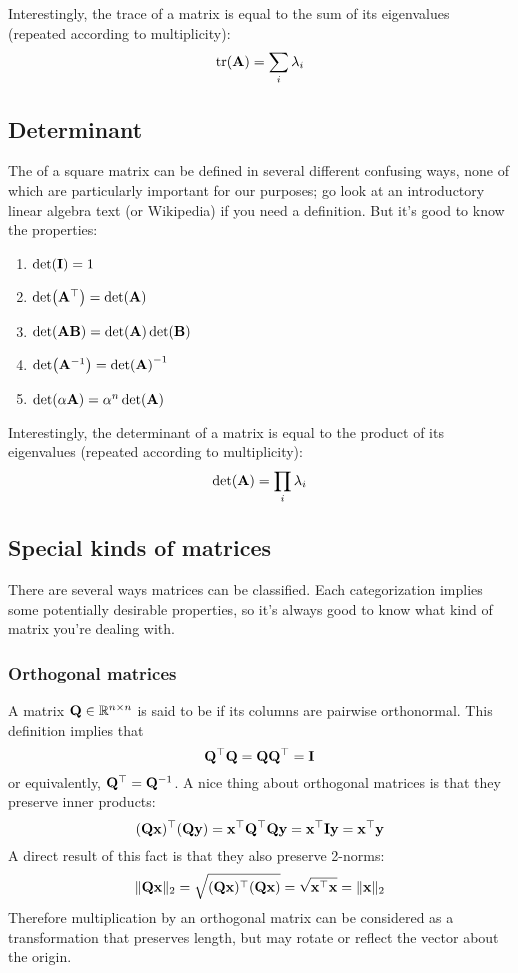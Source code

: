 Interestingly, the trace of a matrix is equal to the sum of its eigenvalues (repeated according to multiplicity):
\[\tr(\mathbf{A}) = \sum_i \lambda_i\]

\subsection{Determinant}
The  of a square matrix can be defined in several different confusing ways, none of which are particularly important for our purposes; go look at an introductory linear algebra text (or Wikipedia) if you need a definition.
But it's good to know the properties:
\begin{enumerate}
\item $\det(\mathbf{I}) = 1$
\item $\det(\mathbf{A}^\top) = \det(\mathbf{A})$
\item $\det(\mathbf{A}\mathbf{B}) = \det(\mathbf{A})\det(\mathbf{B})$
\item $\det(\mathbf{A}^{-1}) = \det(\mathbf{A})^{-1}$
\item $\det(\alpha\mathbf{A}) = \alpha^n \det(\mathbf{A})$
\end{enumerate}
Interestingly, the determinant of a matrix is equal to the product of its eigenvalues (repeated according to multiplicity):
\[\det(\mathbf{A}) = \prod_i \lambda_i\]

\subsection{Special kinds of matrices}
There are several ways matrices can be classified.
Each categorization implies some potentially desirable properties, so it's always good to know what kind of matrix you're dealing with.

\subsubsection{Orthogonal matrices}
A matrix $\mathbf{Q} \in \mathbb{R}^{n \times n}$ is said to be  if its columns are pairwise orthonormal.
This definition implies that
\[\mathbf{Q}^\top \mathbf{Q} = \mathbf{Q}\mathbf{Q}^\top = \mathbf{I}\]
or equivalently, $\mathbf{Q}^\top = \mathbf{Q}^{-1}$. A nice thing about orthogonal matrices is that they preserve inner products:
\[(\mathbf{Q}\mathbf{x})^\top(\mathbf{Q}\mathbf{y}) = \mathbf{x}^\top \mathbf{Q}^\top \mathbf{Q}\mathbf{y} = \mathbf{x}^\top \mathbf{I}\mathbf{y} = \mathbf{x}^\top\mathbf{y}\]
A direct result of this fact is that they also preserve 2-norms:
\[\|\mathbf{Q}\mathbf{x}\|_2 = \sqrt{(\mathbf{Q}\mathbf{x})^\top(\mathbf{Q}\mathbf{x})} = \sqrt{\mathbf{x}^\top\mathbf{x}} = \|\mathbf{x}\|_2\]
Therefore multiplication by an orthogonal matrix can be considered as a transformation that preserves length, but may rotate or reflect the vector about the origin.

